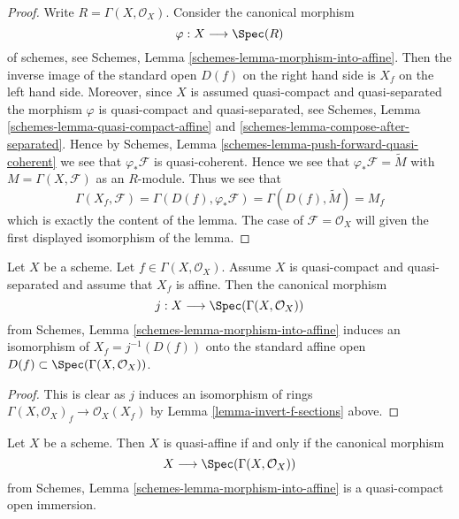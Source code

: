 \begin{proof}
Write $R = \Gamma(X, \mathcal{O}_X)$.
Consider the canonical morphism
$$
\varphi : X \longrightarrow \Spec(R)
$$
of schemes, see
Schemes, Lemma
\ref{schemes-lemma-morphism-into-affine}.
Then the inverse image of the standard open $D(f)$ on the
right hand side is $X_f$ on the left hand side.
Moreover, since $X$ is assumed quasi-compact and quasi-separated
the morphism $\varphi$ is quasi-compact and quasi-separated,
see Schemes, Lemma \ref{schemes-lemma-quasi-compact-affine} and
\ref{schemes-lemma-compose-after-separated}. Hence by
Schemes, Lemma \ref{schemes-lemma-push-forward-quasi-coherent}
we see that $\varphi_*\mathcal{F}$ is quasi-coherent.
Hence we see that $\varphi_*\mathcal{F} = \widetilde M$
with $M = \Gamma(X, \mathcal{F})$ as an $R$-module.
Thus we see that
$$
\Gamma(X_f, \mathcal{F}) =
\Gamma(D(f), \varphi_*\mathcal{F}) =
\Gamma(D(f), \widetilde M) = M_f
$$
which is exactly the content of the lemma. The case of
$\mathcal{F} = \mathcal{O}_X$ will given the first displayed isomorphism
of the lemma.
\end{proof}

\begin{lemma}
\label{lemma-invert-f-affine}
Let $X$ be a scheme. Let $f \in \Gamma(X, \mathcal{O}_X)$.
Assume $X$ is quasi-compact and quasi-separated and assume that
$X_f$ is affine. Then the canonical morphism
$$
j : X \longrightarrow \Spec(\Gamma(X, \mathcal{O}_X))
$$
from Schemes, Lemma \ref{schemes-lemma-morphism-into-affine}
induces an isomorphism of $X_f = j^{-1}(D(f))$ onto the standard affine
open $D(f) \subset \Spec(\Gamma(X, \mathcal{O}_X))$.
\end{lemma}

\begin{proof}
This is clear as $j$ induces an isomorphism of rings
$\Gamma(X, \mathcal{O}_X)_f \to \mathcal{O}_X(X_f)$ by
Lemma \ref{lemma-invert-f-sections} above.
\end{proof}

\begin{lemma}
\label{lemma-quasi-affine}
Let $X$ be a scheme. Then $X$ is quasi-affine if and only if
the canonical morphism
$$
X \longrightarrow \Spec(\Gamma(X, \mathcal{O}_X))
$$
from Schemes, Lemma \ref{schemes-lemma-morphism-into-affine} is
a quasi-compact open immersion.
\end{lemma}

